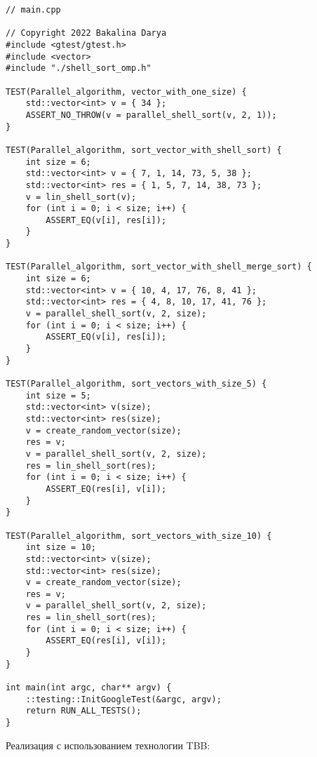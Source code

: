 \documentclass{report}
\begin{document}
\begin{lstlisting}
// main.cpp

// Copyright 2022 Bakalina Darya
#include <gtest/gtest.h>
#include <vector>
#include "./shell_sort_omp.h"

TEST(Parallel_algorithm, vector_with_one_size) {
    std::vector<int> v = { 34 };
    ASSERT_NO_THROW(v = parallel_shell_sort(v, 2, 1));
}

TEST(Parallel_algorithm, sort_vector_with_shell_sort) {
    int size = 6;
    std::vector<int> v = { 7, 1, 14, 73, 5, 38 };
    std::vector<int> res = { 1, 5, 7, 14, 38, 73 };
    v = lin_shell_sort(v);
    for (int i = 0; i < size; i++) {
        ASSERT_EQ(v[i], res[i]);
    }
}

TEST(Parallel_algorithm, sort_vector_with_shell_merge_sort) {
    int size = 6;
    std::vector<int> v = { 10, 4, 17, 76, 8, 41 };
    std::vector<int> res = { 4, 8, 10, 17, 41, 76 };
    v = parallel_shell_sort(v, 2, size);
    for (int i = 0; i < size; i++) {
        ASSERT_EQ(v[i], res[i]);
    }
}

TEST(Parallel_algorithm, sort_vectors_with_size_5) {
    int size = 5;
    std::vector<int> v(size);
    std::vector<int> res(size);
    v = create_random_vector(size);
    res = v;
    v = parallel_shell_sort(v, 2, size);
    res = lin_shell_sort(res);
    for (int i = 0; i < size; i++) {
        ASSERT_EQ(res[i], v[i]);
    }
}

TEST(Parallel_algorithm, sort_vectors_with_size_10) {
    int size = 10;
    std::vector<int> v(size);
    std::vector<int> res(size);
    v = create_random_vector(size);
    res = v;
    v = parallel_shell_sort(v, 2, size);
    res = lin_shell_sort(res);
    for (int i = 0; i < size; i++) {
        ASSERT_EQ(res[i], v[i]);
    }
}

int main(int argc, char** argv) {
    ::testing::InitGoogleTest(&argc, argv);
    return RUN_ALL_TESTS();
}

\end{lstlisting}

\par Реализация с использованием технологии TBB:
\end{document}
